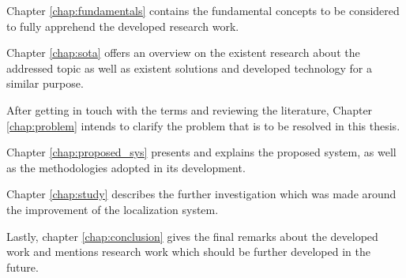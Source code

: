 Chapter \ref{chap:fundamentals} contains the fundamental concepts to be considered to fully apprehend the developed research work.

Chapter \ref{chap:sota} offers an overview on the existent research about the addressed topic as well as existent solutions and developed technology for a similar purpose.

After getting in touch with the terms and reviewing the literature, Chapter \ref{chap:problem} intends to clarify the problem that is to be resolved in this thesis.

Chapter \ref{chap:proposed_sys} presents and explains the proposed system, as well as the methodologies adopted in its development.

Chapter \ref{chap:study} describes the further investigation which was made around the improvement of the localization system.

Lastly, chapter \ref{chap:conclusion} gives the final remarks about the developed work and mentions research work which should be further developed in the future.  
